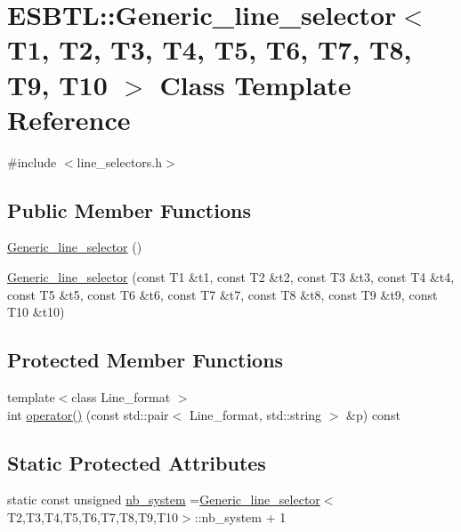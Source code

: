 \hypertarget{classESBTL_1_1Generic__line__selector}{}\section{E\+S\+B\+TL\+:\+:Generic\+\_\+line\+\_\+selector$<$ T1, T2, T3, T4, T5, T6, T7, T8, T9, T10 $>$ Class Template Reference}
\label{classESBTL_1_1Generic__line__selector}


{\ttfamily \#include $<$line\+\_\+selectors.\+h$>$}

\subsection*{Public Member Functions}
\begin{DoxyCompactItemize}
\item 
\hyperlink{classESBTL_1_1Generic__line__selector_a7323ec53a256a6b6d96d47381f13bc96}{Generic\+\_\+line\+\_\+selector} ()
\item 
\hyperlink{classESBTL_1_1Generic__line__selector_aa044db1d64646e582a990d87ead787a1}{Generic\+\_\+line\+\_\+selector} (const T1 \&t1, const T2 \&t2, const T3 \&t3, const T4 \&t4, const T5 \&t5, const T6 \&t6, const T7 \&t7, const T8 \&t8, const T9 \&t9, const T10 \&t10)
\end{DoxyCompactItemize}
\subsection*{Protected Member Functions}
\begin{DoxyCompactItemize}
\item 
{\footnotesize template$<$class Line\+\_\+format $>$ }\\int \hyperlink{classESBTL_1_1Generic__line__selector_aae6575ee43ada5b43d845bbc3a095f9d}{operator()} (const std\+::pair$<$ Line\+\_\+format, std\+::string $>$ \&p) const
\end{DoxyCompactItemize}
\subsection*{Static Protected Attributes}
\begin{DoxyCompactItemize}
\item 
static const unsigned \hyperlink{classESBTL_1_1Generic__line__selector_a1dd59942b4571825b8d969813975e573}{nb\+\_\+system} =\hyperlink{classESBTL_1_1Generic__line__selector}{Generic\+\_\+line\+\_\+selector}$<$T2,T3,T4,T5,T6,T7,T8,T9,T10$>$\+::nb\+\_\+system + 1
\end{DoxyCompactItemize}


